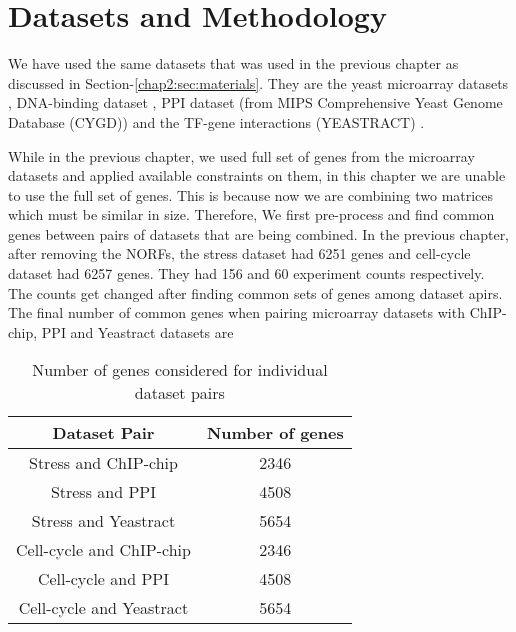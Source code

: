 \section{Datasets and Methodology} \label{chap3:sec:materials}

We have used the same datasets that was used in the previous chapter as discussed in Section-\ref{chap2:sec:materials}. They are the yeast microarray 
datasets \citep{gasch00genomicexpn,spellman98comprehensive}, DNA-binding dataset \citep{harbison04transcriptional}, 
PPI dataset (from MIPS Comprehensive Yeast Genome Database (CYGD)) \citep{Gueldener2006MPact} and the TF-gene interactions (YEASTRACT) \citep{Teixeira06yeastract}. 

While in the previous chapter, we used full set of genes from the microarray datasets and applied available constraints on them, in this chapter we are unable to use 
the full set of genes. This is because now we are combining two matrices which must be similar in size. Therefore, We first pre-process and find common genes between 
pairs of datasets that are being combined. In the previous chapter, after removing the NORFs, the stress dataset had 6251 genes and cell-cycle dataset had 6257 genes. 
They had 156 and 60 experiment counts respectively. The counts get changed after finding common sets of genes among dataset apirs. The final number of common genes when pairing 
microarray datasets with ChIP-chip, PPI and Yeastract datasets are   
 
\begin{table}
\centering
\begin{tabular}{|c|c|}
\hline
Dataset Pair & Number of genes \\ 
\hline
Stress and ChIP-chip & 2346 \\
Stress and PPI       & 4508 \\
Stress and Yeastract  & 5654 \\
\hline 
Cell-cycle and ChIP-chip & 2346\\
Cell-cycle and PPI       & 4508\\
Cell-cycle and Yeastract  & 5654\\
\hline
\end{tabular}
\caption{Number of genes considered for individual dataset pairs}
\label{tab:no_constraints}
\end{table}

